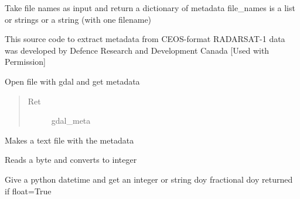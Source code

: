 \documentclass[letterpaper,10pt,english]{sphinxmanual}
\begin{document}
\begin{fulllineitems}
\begin{fulllineitems}
\label{code:Metadata.Metadata.get_ceos_metadata}
Take file names as input and return a dictionary of metadata
file\_names is a list or strings or a string (with one filename)

This source code to extract metadata from CEOS-format RADARSAT-1 
data was developed by Defence Research and Development Canada
{[}Used with Permission{]}

\end{fulllineitems}


\begin{fulllineitems}
\label{code:Metadata.Metadata.getgdalmeta}
Open file with gdal and get metadata
\begin{quote}\begin{description}
\item[{Ret}] \leavevmode
gdal\_meta

\end{description}\end{quote}

\end{fulllineitems}


\begin{fulllineitems}
\label{code:Metadata.Metadata.saveMetaFile}
Makes a text file with the metadata

\end{fulllineitems}


\end{fulllineitems}


\begin{fulllineitems}
\label{code:Metadata.byte2int}
Reads a byte and converts to integer

\end{fulllineitems}


\begin{fulllineitems}
\label{code:Metadata.date2doy}
Give a python datetime and get an integer or string doy fractional doy returned if float=True

\end{fulllineitems}
\end{document}
